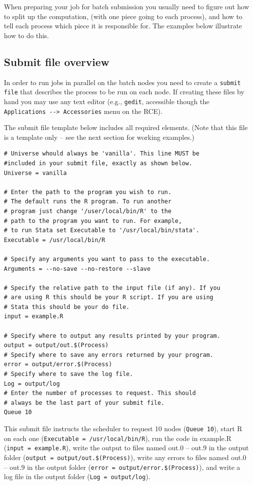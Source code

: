 \documentclass[11pt]{article}
\begin{document}
When preparing your job for batch submission you usually need to figure out how to split up the computation, (with one piece going to each process), and how to tell each process which piece it is responsible for. The examples below illustrate how to do this.

\subsection{Submit file overview}
\label{sec-7-2}
In order to run jobs in parallel on the batch nodes you need to create a \texttt{submit file} that describes the process to be run on each node. If creating these files by hand you may use any text editor (e.g., \texttt{gedit}, accessible though the \texttt{Applications -{}-> Accessories} menu on the RCE). 

The submit file template below includes all required elements. (Note that this file is a template only -- see the next section for working examples.)
\begin{verbatim}
# Universe whould always be 'vanilla'. This line MUST be 
#included in your submit file, exactly as shown below.
Universe = vanilla

# Enter the path to the program you wish to run.
# The default runs the R program. To run another
# program just change '/user/local/bin/R' to the
# path to the program you want to run. For example,
# to run Stata set Executable to '/usr/local/bin/stata'.
Executable = /usr/local/bin/R

# Specify any arguments you want to pass to the executable.
Arguments = --no-save --no-restore --slave

# Specify the relative path to the input file (if any). If you
# are using R this should be your R script. If you are using
# Stata this should be your do file.
input = example.R

# Specify where to output any results printed by your program.
output = output/out.$(Process)
# Specify where to save any errors returned by your program.
error = output/error.$(Process)
# Specify where to save the log file.
Log = output/log
# Enter the number of processes to request. This should 
# always be the last part of your submit file.
Queue 10
\end{verbatim}
This submit file instructs the scheduler to request 10 nodes (\texttt{Queue 10}), start R on each one (\texttt{Executable = /usr/local/bin/R}), run the code in example.R (\texttt{input = example.R}), write the output to files named out.0 -- out.9 in the output folder (\texttt{output = output/out.\$(Process)}), write any errors to files named out.0 -- out.9 in the output folder (\texttt{error = output/error.\$(Process)}), and write a log file in the output folder (\texttt{Log = output/log}). 
\end{document}
